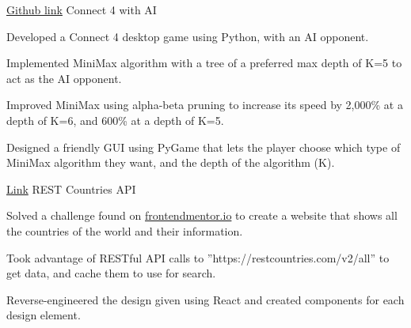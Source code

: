 

\begin{cventries}

  \cventry
    {\href{https://github.com/ad3ldev/Connect4-with-AI}{Github link}} %
    {Connect 4 with AI	} %
    {}
    {} %
    {
      \begin{cvitems} %
        \item {Developed a Connect 4 desktop game using Python, with an AI opponent.}
        \item {Implemented MiniMax algorithm with a tree of a preferred max depth of K=5 to act as the AI opponent.}
        \item {Improved MiniMax using alpha-beta pruning to increase its speed by  2,000\% at a depth of K=6, and 600\% at a depth of K=5.}
        \item {Designed a friendly GUI using PyGame that lets the player choose which type of MiniMax algorithm they want, and the depth of the algorithm (K).}
      \end{cvitems}
    }
  \cventry
    {\href{https://ad3ldev.github.io/rest-countries-api}{Link}} %
    {REST Countries API} %
    {}
    {} %
    {
      \begin{cvitems} %
        \item {Solved a challenge found on \href{frontendmentor.io}{frontendmentor.io} to create a website that shows all the countries of the world and their information.}
        \item {Took advantage of RESTful API calls to ”https://restcountries.com/v2/all” to get data, and cache them to use for search.}
        \item {Reverse-engineered the design given using React and created components for each design element.}
      \end{cvitems}
    }
\end{cventries}

